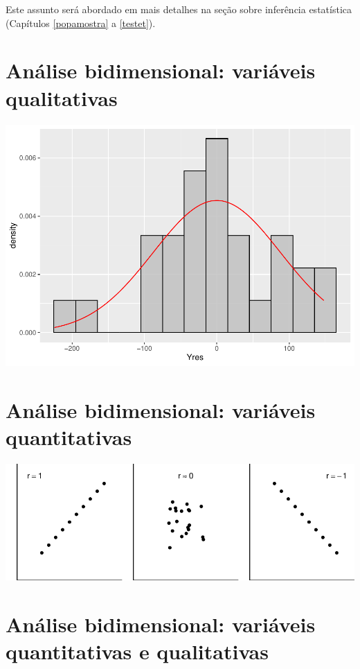 \documentclass[
]{book}
\begin{document}
Este assunto será abordado em mais detalhes na seção sobre inferência estatística (Capítulos \ref{popamostra} a \ref{testet}).

\hypertarget{biquali}{%
\chapter{Análise bidimensional: variáveis qualitativas}\label{biquali}}

\begin{center}\includegraphics{probest-cambientais_files/figure-latex/unnamed-chunk-158-1} \end{center}

\hypertarget{biquant}{%
\chapter{Análise bidimensional: variáveis quantitativas}\label{biquant}}

\begin{center}\includegraphics{probest-cambientais_files/figure-latex/unnamed-chunk-161-1} \end{center}

\hypertarget{biquantquali}{%
\chapter{Análise bidimensional: variáveis quantitativas e qualitativas}\label{biquantquali}}
\end{document}
